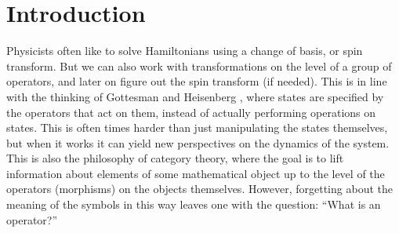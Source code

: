 

\renewenvironment{framed}
{\begin{samepage}
\MakeFramed{\hsize0.8\linewidth\advance\hsize-\width\FrameRestore}}
{\endMakeFramed\end{samepage}}









%
%

\section{Introduction}

Physicists often like to solve Hamiltonians 
using a change of basis, or spin transform.
But we can also work with transformations on the level of a
group of operators,
and later on figure out the spin transform (if needed).
This is in line with the thinking of 
Gottesman and Heisenberg \cite{Gottesman1998}, where states are
specified by the operators that act on them, instead of
actually performing operations on states.
This is often times harder than just manipulating the
states themselves, but when it works it can yield
new perspectives on the dynamics of the system.
This is also
the philosophy of category theory, where the goal is to lift
information about elements of some mathematical object
up to the level of the operators (morphisms) on the
objects themselves.
However, forgetting about the meaning of the symbols in this way 
leaves one with the question:
``What is an operator?''

